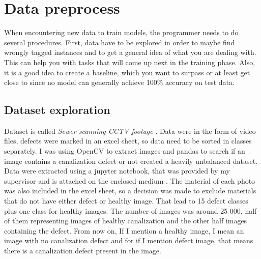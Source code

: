 \documentclass[thesis=B,english]{FITthesis}[2019/12/23]
\begin{document}
\section{Data preprocess}
When encountering new data to train models, the programmer needs to do several procedures. First, data have to be explored in order to maybe find wrongly tagged instances and to get a general idea of what you are dealing with. This can help you with tasks that will come up next in the training phase. Also, it is a good idea to create a baseline, which you want to surpass or at least get close to since no model can generally achieve 100\% accuracy on test data. 

\subsection{Dataset exploration}
Dataset is called \emph{Sewer scanning CCTV footage} \cite{wessex_dataset}. Data were in the form of video files, defects were marked in an excel sheet, so data need to be sorted in classes separately. I was using OpenCV to extract images and pandas to search if an image contains a canalization defect or not created a heavily unbalanced dataset. Data were extracted using a jupyter notebook, that was provided by my supervisor and is attached on the enclosed medium \cite{mvi_extraction_notebook}. The material of each photo was also included in the excel sheet, so a decision was made to exclude materials that do not have either defect or healthy image. That lead to 15 defect classes plus one class for healthy images. The number of images was around 25 000, half of them representing images of healthy canalization and the other half images containing the defect. From now on, If I mention a healthy image, I mean an image with no canalization defect and for if I mention defect image, that means there is a canalization defect present in the image.
\end{document}
